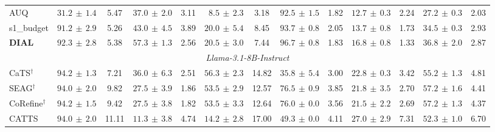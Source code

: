 \begin{table}[t]
{\begin{tabular}{l *{6}{rc} }
AUQ & $31.2{\scriptscriptstyle\,\pm\,1.4}$ & 5.47 & $37.0{\scriptscriptstyle\,\pm\,2.0}$ & 3.11 & $8.5{\scriptscriptstyle\,\pm\,2.3}$ & 3.18 & $92.5{\scriptscriptstyle\,\pm\,1.5}$ & 1.82 & $12.7{\scriptscriptstyle\,\pm\,0.3}$ & 2.24 & $27.2{\scriptscriptstyle\,\pm\,0.3}$ & 2.03 \\
s1\_budget & \cellcolor[HTML]{E5EDF7}$91.2{\scriptscriptstyle\,\pm\,2.9}$ & 5.26 & \cellcolor[HTML]{E5EDF7}$43.0{\scriptscriptstyle\,\pm\,4.5}$ & 3.89 & \cellcolor[HTML]{E5EDF7}$20.0{\scriptscriptstyle\,\pm\,5.4}$ & 8.45 & \cellcolor[HTML]{E5EDF7}$93.7{\scriptscriptstyle\,\pm\,0.8}$ & 2.05 & $13.7{\scriptscriptstyle\,\pm\,0.8}$ & 1.73 & \cellcolor[HTML]{E5EDF7}$34.5{\scriptscriptstyle\,\pm\,0.3}$ & 2.93 \\
\textbf{DIAL} & \cellcolor[HTML]{FBE7EB}$92.3{\scriptscriptstyle\,\pm\,2.8}$ & 5.38 & \cellcolor[HTML]{FBE7EB}$57.3{\scriptscriptstyle\,\pm\,1.3}$ & 2.56 & \cellcolor[HTML]{FBE7EB}$20.5{\scriptscriptstyle\,\pm\,3.0}$ & 7.44 & \cellcolor[HTML]{FBE7EB}$96.7{\scriptscriptstyle\,\pm\,0.8}$ & 1.83 & \cellcolor[HTML]{FBE7EB}$16.8{\scriptscriptstyle\,\pm\,0.8}$ & 1.33 & \cellcolor[HTML]{FBE7EB}$36.8{\scriptscriptstyle\,\pm\,2.0}$ & 2.87 \\
\midrule
\multicolumn{13}{c}{\textit{Llama-3.1-8B-Instruct}} \\
\midrule
CaTS$^\dagger$ & $94.2{\scriptscriptstyle\,\pm\,1.3}$ & 7.21 & $36.0{\scriptscriptstyle\,\pm\,6.3}$ & 2.51 & \cellcolor[HTML]{FBE7EB}$56.3{\scriptscriptstyle\,\pm\,2.3}$ & 14.82 & $35.8{\scriptscriptstyle\,\pm\,5.4}$ & 3.00 & $22.8{\scriptscriptstyle\,\pm\,0.3}$ & 3.42 & $55.2{\scriptscriptstyle\,\pm\,1.3}$ & 4.81 \\
SEAG$^\dagger$ & $94.0{\scriptscriptstyle\,\pm\,2.0}$ & 9.82 & $27.5{\scriptscriptstyle\,\pm\,3.9}$ & 1.86 & $53.5{\scriptscriptstyle\,\pm\,2.9}$ & 12.57 & \cellcolor[HTML]{E5EDF7}$76.5{\scriptscriptstyle\,\pm\,0.9}$ & 3.85 & $21.8{\scriptscriptstyle\,\pm\,3.5}$ & 2.70 & \cellcolor[HTML]{E5EDF7}$57.2{\scriptscriptstyle\,\pm\,1.6}$ & 4.41 \\
CoRefine$^\dagger$ & $94.2{\scriptscriptstyle\,\pm\,1.5}$ & 9.42 & $27.5{\scriptscriptstyle\,\pm\,3.8}$ & 1.82 & $53.5{\scriptscriptstyle\,\pm\,3.3}$ & 12.64 & $76.0{\scriptscriptstyle\,\pm\,0.0}$ & 3.56 & $21.5{\scriptscriptstyle\,\pm\,2.2}$ & 2.69 & $57.2{\scriptscriptstyle\,\pm\,1.3}$ & 4.37 \\
CATTS & $94.0{\scriptscriptstyle\,\pm\,2.0}$ & 11.11 & $11.3{\scriptscriptstyle\,\pm\,3.8}$ & 4.74 & $14.2{\scriptscriptstyle\,\pm\,2.8}$ & 17.00 & $49.3{\scriptscriptstyle\,\pm\,0.0}$ & 4.11 & \cellcolor[HTML]{FBE7EB}$27.0{\scriptscriptstyle\,\pm\,2.9}$ & 7.31 & $52.3{\scriptscriptstyle\,\pm\,1.0}$ & 6.70 \\

\end{tabular}}
\end{table}

